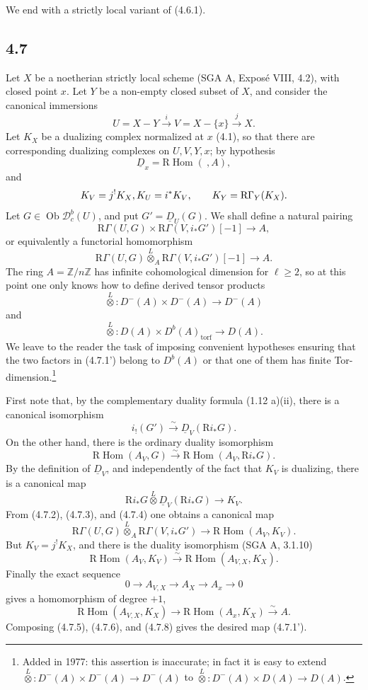 \documentclass[11pt]{article}
\theoremstyle{plain}
\theoremstyle{definition}
\theoremstyle{remark}
\newcommand{\ZZ}{\mathbb Z}
\newcommand{\D}{\mathcal D}\newcommand{\E}{\mathcal E}\newcommand{\F}{\mathcal F}
\DeclareMathOperator{\Hom}{Hom}
\DeclareMathOperator{\ob}{Ob}
\newcommand{\R}{\mathrm R}
\begin{document}
We end with a strictly local variant of (4.6.1).

\subsection*{4.7}
Let $X$ be a noetherian strictly local scheme (SGA A, Exposé VIII, 4.2), with closed point $x$. Let $Y$ be a non-empty closed subset of $X$, and consider the canonical immersions
\[
   U=X-Y\xrightarrow{i}V=X-\{x\}\xrightarrow{j}X.
\]
Let $K_X$ be a dualizing complex normalized at $x$ (4.1), so that there are corresponding dualizing complexes on $U,V,Y,x$; by hypothesis
\[
   \underline D_x=\R\Hom(\ ,A),
\]
and
\[
   K_V=j^!K_X,\\ K_U=i^*K_V,
   \qquad K_Y=\R\Gamma_Y(K_X).
\]
Let $G\in\ob\D_c^b(U)$, and put $G'=\underline D_U(G)$. We shall define a natural pairing
\[
   \R\Gamma(U,G)\times\R\Gamma(V,i_*G')[-1]
       \longrightarrow A,\tag{4.7.1}
\]
or equivalently a functorial homomorphism
\[
   \R\Gamma(U,G)\overset{L}{\otimes}_A
   \R\Gamma(V,i_*G')[-1]\longrightarrow A.\tag{4.7.1'}
\]
The ring $A=\ZZ/n\ZZ$ has infinite cohomological dimension for $\ell\ge2$, so at this point one only knows how to define derived tensor products
\[
   \overset L\otimes:D^-(A)\times D^-(A)\to D^-(A)
\]
and
\[
   \overset L\otimes:D(A)\times D^b(A)_{\mathrm{torf}}\to D(A).
\]
We leave to the reader the task of imposing convenient hypotheses ensuring that the two factors in (4.7.1') belong to $D^b(A)$ or that one of them has finite Tor-dimension.\footnote{Added in 1977: this assertion is inaccurate; in fact it is easy to extend $\overset L\otimes:D^-(A)\times D^-(A)\to D^-(A)$ to $\overset L\otimes:D^-(A)\times D(A)\to D(A)$.}

First note that, by the complementary duality formula (1.12 a)(ii), there is a canonical isomorphism
\[
   i_!(G')\xrightarrow{\sim}\underline D_V(\R i_*G).\tag{4.7.2}
\]
On the other hand, there is the ordinary duality isomorphism
\[
   \R\Hom(A_V,G)\xrightarrow{\sim}\R\Hom(A_V,\R i_*G).\tag{4.7.3}
\]
By the definition of $\underline D_V$, and independently of the fact that $K_V$ is dualizing, there is a canonical map
\[
   \R i_*G\overset L\otimes \underline D_V(\R i_*G)
      \longrightarrow K_V.\tag{4.7.4}
\]
From (4.7.2), (4.7.3), and (4.7.4) one obtains a canonical map
\[
   \R\Gamma(U,G)\overset L\otimes_A \R\Gamma(V,i_*G')
      \longrightarrow \R\Hom(A_V,K_V).\tag{4.7.5}
\]
But $K_V=j^!K_X$, and there is the duality isomorphism (SGA A, 3.1.10)
\[
   \R\Hom(A_V,K_V)\xrightarrow{\sim}\R\Hom(A_{V,X},K_X).\tag{4.7.6}
\]
Finally the exact sequence
\[
   0\longrightarrow A_{V,X}\longrightarrow A_X\longrightarrow A_x\longrightarrow0\tag{4.7.7}
\]
gives a homomorphism of degree $+1$,
\[
   \R\Hom(A_{V,X},K_X)\longrightarrow
   \R\Hom(A_x,K_X)\xrightarrow{\sim}A.\tag{4.7.8}
\]
Composing (4.7.5), (4.7.6), and (4.7.8) gives the desired map (4.7.1').
\end{document}
